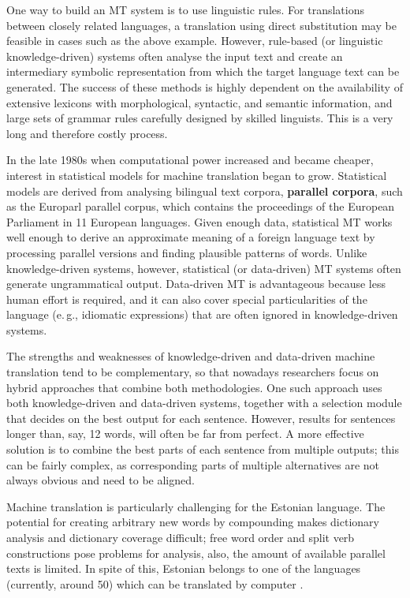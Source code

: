 \begin{multicols}{2}
One way to build an MT system is to use linguistic rules. For translations between closely related languages, a translation using direct substitution may be feasible in cases such as the above example. However, rule-based (or linguistic knowledge-driven) systems often analyse the input text and create an intermediary symbolic representation from which the target language text can be generated. The success of these methods is highly dependent on the availability of extensive lexicons with morphological, syntactic, and semantic information, and large sets of grammar rules carefully designed by skilled linguists. This is a very long and therefore costly process.

In the late 1980s when computational power increased and became cheaper, interest in statistical models for machine translation began to grow. Statistical models are derived from analysing bilingual text corpora, \textbf{parallel corpora}, such as the Europarl parallel corpus, which contains the proceedings of the European Parliament in 11 European languages. Given enough data, statistical MT works well enough to derive an approximate meaning of a foreign language text by processing parallel versions and finding plausible patterns of words. Unlike knowledge-driven systems, however, statistical (or data-driven) MT systems often generate ungrammatical output. Data-driven MT is advantageous because less human effort is required, and it can also cover special particularities of the language (e.\,g., idiomatic expressions) that are often ignored in knowledge-driven systems. 

The strengths and weaknesses of knowledge-driven and data-driven machine translation tend to be complementary, so that nowadays researchers focus on hybrid approaches that combine both methodologies. One such approach uses both knowledge-driven and data-driven systems, together with a selection module that decides on the best output for each sentence. However, results for sentences longer than, say, 12 words, will often be far from perfect. A more effective solution is to combine the best parts of each sentence from multiple outputs; this can be fairly complex, as corresponding parts of multiple alternatives are not always obvious and need to be aligned. 


Machine translation is particularly challenging for the Estonian language. 
The potential for creating arbitrary new words by compounding makes dictionary analysis and dictionary coverage difficult; free word order and split verb constructions pose problems for analysis, also, the amount of available parallel texts is limited. 
In spite of this, Estonian belongs to one of the languages (currently, around 50) which can be translated by computer \cite{Koit}. 


\end{multicols}

